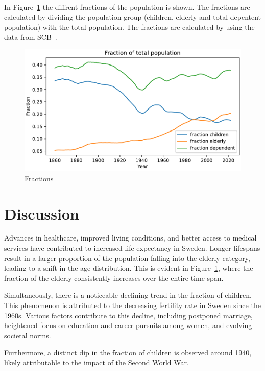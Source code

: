 \documentclass[a4paper]{article}
\begin{document}
\newpage

In Figure~\ref{fig:fractions} the diffrent fractions of the population is shown. The fractions 
are calculated by dividing the population group (children, elderly and total depentent population) with the total population. 
The fractions are calculated by using the data from SCB~\cite{SCB:2023}.


\begin{figure}[h]
  \begin{center}
    \includegraphics[width=\textwidth]{fractions.pdf}
    \caption{Fractions}
    \label{fig:fractions}
  \end{center}
\end{figure}


\section*{Discussion}
Advances in healthcare, improved living conditions, and better access to medical services have contributed to increased life 
expectancy in Sweden. Longer lifespans result in a larger proportion of the population falling into the elderly category,
leading to a shift in the age distribution. This is evident in Figure~\ref{fig:fractions}, where the fraction of the elderly consistently increases over the entire time span.

Simultaneously, there is a noticeable declining trend in the fraction of children. This phenomenon is attributed to the decreasing fertility rate in Sweden since the 1960s. 
Various factors contribute to this decline, including postponed marriage, heightened focus on education and career pursuits among women, and evolving societal norms.

Furthermore, a distinct dip in the fraction of children is observed around 1940, likely attributable to the impact of the Second World War.
\end{document}
